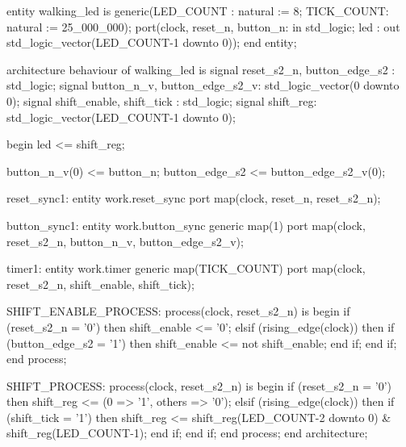 \begin{vhdlcode}
entity walking_led is
    generic(LED_COUNT : natural := 8;
            TICK_COUNT: natural := 25_000_000);
    port(clock, reset_n, button_n: in std_logic;
         led                     : out std_logic_vector(LED_COUNT-1 downto 0));
end entity;

architecture behaviour of walking_led is
signal reset_s2_n, button_edge_s2  : std_logic;
signal button_n_v, button_edge_s2_v: std_logic_vector(0 downto 0);
signal shift_enable, shift_tick    : std_logic;
signal shift_reg: std_logic_vector(LED_COUNT-1 downto 0);

begin
    led <= shift_reg;

    button_n_v(0)  <= button_n;
    button_edge_s2 <= button_edge_s2_v(0);

    reset_sync1: entity work.reset_sync
        port map(clock, reset_n, reset_s2_n);

    button_sync1: entity work.button_sync
        generic map(1)
        port map(clock, reset_s2_n, button_n_v, button_edge_s2_v);

    timer1: entity work.timer
        generic map(TICK_COUNT)
        port map(clock, reset_s2_n, shift_enable, shift_tick);

    SHIFT_ENABLE_PROCESS: process(clock, reset_s2_n) is
    begin
        if (reset_s2_n = '0') then
            shift_enable <= '0';
        elsif (rising_edge(clock)) then
            if (button_edge_s2 = '1') then
                shift_enable <= not shift_enable;
            end if;
        end if;
    end process;

    SHIFT_PROCESS: process(clock, reset_s2_n) is
    begin
        if (reset_s2_n = '0') then
            shift_reg <= (0 => '1', others => '0');
        elsif (rising_edge(clock)) then
            if (shift_tick = '1') then
                shift_reg <= shift_reg(LED_COUNT-2 downto 0) & shift_reg(LED_COUNT-1);
            end if;
        end if;
    end process;
end architecture;
\end{vhdlcode}

